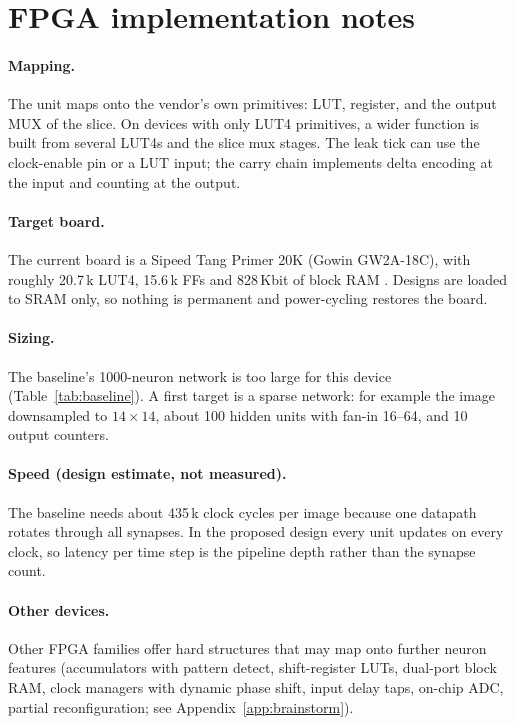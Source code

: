 \section{FPGA implementation notes}
\label{sec:impl}
\paragraph{Mapping.} The unit maps onto the vendor's own primitives: LUT, register, and the output MUX of the slice. On devices with only LUT4 primitives, a wider function is built from several LUT4s and the slice mux stages. The leak tick can use the clock-enable pin or a LUT input; the carry chain implements delta encoding at the input and counting at the output.

\paragraph{Target board.} The current board is a Sipeed Tang Primer 20K (Gowin GW2A-18C), with roughly 20.7\,k LUT4, 15.6\,k FFs and 828\,Kbit of block RAM . Designs are loaded to SRAM only, so nothing is permanent and power-cycling restores the board.

\paragraph{Sizing.} The baseline's 1000-neuron network is too large for this device (Table~\ref{tab:baseline}). A first target is a sparse network: for example the image downsampled to $14\times14$, about 100 hidden units with fan-in 16--64, and 10 output counters. 

\paragraph{Speed (design estimate, not measured).} The baseline needs about 435\,k clock cycles per image because one datapath rotates through all synapses. In the proposed design every unit updates on every clock, so latency per time step is the pipeline depth rather than the synapse count. 

\paragraph{Other devices.} Other FPGA families offer hard structures that may map onto further neuron features (accumulators with pattern detect, shift-register LUTs, dual-port block RAM, clock managers with dynamic phase shift, input delay taps, on-chip ADC, partial reconfiguration; see Appendix~\ref{app:brainstorm}). 

